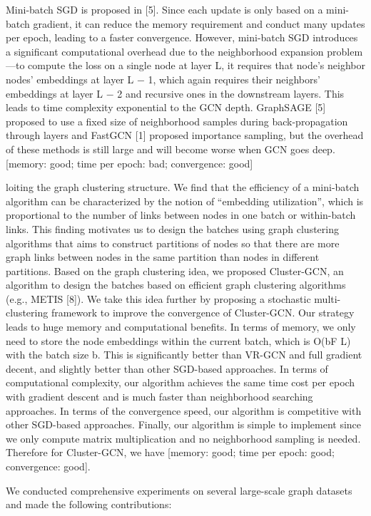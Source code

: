 \documentclass[
]{book}
\begin{document}
{{{Mini-batch SGD is proposed in {[}5{]}. Since each update is only based on a mini-batch gradient, it can reduce the memory requirement and conduct many updates per epoch, leading to a faster convergence. However, mini-batch SGD introduces a significant computational overhead due to the neighborhood expansion problem---to compute the loss on a single node at layer L, it requires that node's neighbor nodes' embeddings at layer L − 1, which again requires their neighbors' embeddings at layer L − 2 and recursive ones in the downstream layers. This leads to time complexity exponential to the GCN depth. GraphSAGE {[}5{]} proposed to use a fixed size of neighborhood samples during back-propagation through layers and FastGCN {[}1{]} proposed importance sampling, but the overhead of these methods is still large and will become worse when GCN goes deep. {[}memory: good; time per epoch: bad; convergence: good{]}

loiting the graph clustering structure. We find that the efficiency of a mini-batch algorithm can be characterized by the notion of ``embedding utilization'', which is proportional to the number of links between nodes in one batch or within-batch links. This finding motivates us to design the batches using graph clustering algorithms that aims to construct partitions of nodes so that there are more graph links between nodes in the same partition than nodes in different partitions. Based on the graph clustering idea, we proposed Cluster-GCN, an algorithm to design the batches based on efficient graph clustering algorithms (e.g., METIS {[}8{]}). We take this idea further by proposing a stochastic multi-clustering framework to improve the convergence of Cluster-GCN. Our strategy leads to huge memory and computational benefits. In terms of memory, we only need to store the node embeddings within the current batch, which is O(bF L) with the batch size b. This is significantly better than VR-GCN and full gradient decent, and slightly better than other SGD-based approaches. In terms of computational complexity, our algorithm achieves the same time cost per epoch with gradient descent and is much faster than neighborhood searching approaches. In terms of the convergence speed, our algorithm is competitive with other SGD-based approaches. Finally, our algorithm is simple to implement since we only compute matrix multiplication and no neighborhood sampling is needed. Therefore for Cluster-GCN, we have {[}memory: good; time per epoch: good; convergence: good{]}.

We conducted comprehensive experiments on several large-scale graph datasets and made the following contributions:

}}}
\end{document}
